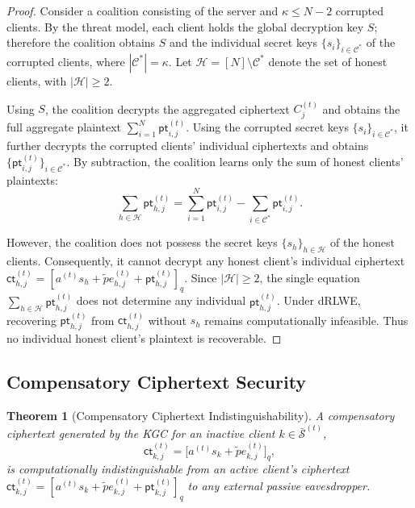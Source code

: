 \documentclass[a4paper,11pt]{article}
\newtheorem{theorem}{Theorem}
\begin{document}
\begin{proof}
Consider a coalition consisting of the server and $\kappa \le N-2$ corrupted clients. By the threat model, each client holds the global decryption key $S$; therefore the coalition obtains $S$ and the individual secret keys $\{s_i\}_{i \in \mathcal{C}^*}$ of the corrupted clients, where $|\mathcal{C}^*| = \kappa$. Let $\mathcal{H} = [N] \setminus \mathcal{C}^*$ denote the set of honest clients, with $|\mathcal{H}| \ge 2$.

Using $S$, the coalition decrypts the aggregated ciphertext $C_j^{(t)}$ and obtains the full aggregate plaintext $\sum_{i=1}^N \mathsf{pt}_{i,j}^{(t)}$. Using the corrupted secret keys $\{s_i\}_{i \in \mathcal{C}^*}$, it further decrypts the corrupted clients' individual ciphertexts and obtains $\{\mathsf{pt}_{i,j}^{(t)}\}_{i \in \mathcal{C}^*}$. By subtraction, the coalition learns only the sum of honest clients' plaintexts:
\begin{equation*}
    \sum_{h \in \mathcal{H}} \mathsf{pt}_{h,j}^{(t)}
    = \sum_{i=1}^N \mathsf{pt}_{i,j}^{(t)} - \sum_{i \in \mathcal{C}^*} \mathsf{pt}_{i,j}^{(t)}.
\end{equation*}

However, the coalition does not possess the secret keys $\{s_h\}_{h \in \mathcal{H}}$ of the honest clients. Consequently, it cannot decrypt any honest client's individual ciphertext $\mathsf{ct}_{h,j}^{(t)} = [a^{(t)} s_h + \tilde{p} e_{h,j}^{(t)} + \mathsf{pt}_{h,j}^{(t)}]_q$. Since $|\mathcal{H}| \ge 2$, the single equation $\sum_{h \in \mathcal{H}} \mathsf{pt}_{h,j}^{(t)}$ does not determine any individual $\mathsf{pt}_{h,j}^{(t)}$. Under dRLWE, recovering $\mathsf{pt}_{h,j}^{(t)}$ from $\mathsf{ct}_{h,j}^{(t)}$ without $s_h$ remains computationally infeasible. Thus no individual honest client's plaintext is recoverable.
\end{proof}

\subsection{Compensatory Ciphertext Security}
\label{ssec:compensatory}

\begin{theorem}[Compensatory Ciphertext Indistinguishability]
\label{thm:kgc-indistinguishability}
A compensatory ciphertext generated by the KGC for an inactive client $k \in \bar{\mathcal{S}}^{(t)}$,
\begin{equation*}
    \mathsf{ct}_{k,j}^{(t)} = \bigl[ a^{(t)} s_k + \tilde{p} e_{k,j}^{(t)} \bigr]_q,
\end{equation*}
is computationally indistinguishable from an active client's ciphertext
$\mathsf{ct}_{k,j}^{(t)} = [a^{(t)} s_k + \tilde{p} e_{k,j}^{(t)} + \mathsf{pt}_{k,j}^{(t)}]_q$
to any external passive eavesdropper.
\end{theorem}
\end{document}
